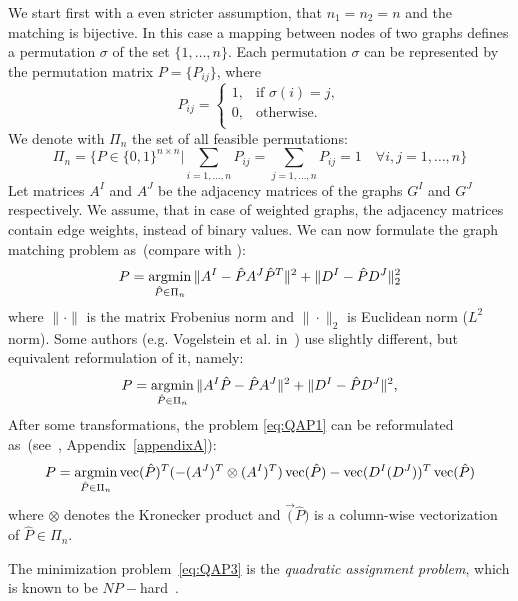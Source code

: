 We start first with a even stricter assumption, that $n_1=n_2=n$ and the matching is bijective. In this case a mapping between nodes of two graphs defines a permutation $\sigma$ of the set $\{1,\dots,n\}$. Each permutation $\sigma$ can be represented by the permutation matrix $P=\{P_{ij}\}$, where
\begin{equation*}
P_{ij}=\begin{cases}
 1, & \text{if } \sigma(i)=j, \\
 0, & \text{otherwise.} \\
\end{cases}
\end{equation*}
We denote with $\Pi_n$ the set of all feasible permutations:
\begin{equation*}
\Pi_n=\{P\in\{0,1\}^{n\times n}|\sum_{i=1,\dots,n}P_{ij}=\sum_{j=1,\dots,n}P_{ij}=1\quad\forall i,j=1,\dots,n\}
\end{equation*}
Let matrices $A^I$ and $A^J$ be the adjacency matrices of the graphs $G^I$ and $G^J$ respectively. We assume, that in case of weighted graphs, the adjacency matrices contain edge weights, instead of binary values. We can now formulate the graph matching problem as~(compare with \cite{Herault1990_SimulatedAnnealing,FastPFP,Lyzinski2015,Roth2001,Umeyam1988,Zazlavskiy2008_PATH}):
\begin{equation} \label{eq:QAP1}
P = \mathop{\rm argmin}_{\hat{P}\in\Pi_n}\|A^I-\hat{P}A^J\hat{P}^T\|^2+\|D^I-\hat{P}D^J\|^2_2
\end{equation}
where $\|\cdot\|$ is the matrix Frobenius norm and $\|\cdot\|_2$ is Euclidean norm ($L^2$ norm). Some authors (e.g. Vogelstein et al. in~\cite{Vogelstein_BrainGraphs}) use slightly different, but equivalent reformulation of it, namely:
\begin{equation} \label{eq:QAP2}
P = \mathop{\rm argmin}_{\hat{P}\in\Pi_n}\|A^I\hat{P}-\hat{P}A^J\|^2+\|D^I-\hat{P}D^J\|^2,
\end{equation}
After some transformations, the problem \eqref{eq:QAP1} can be reformulated as~(see~\cite{Burkard98thequadratic}, Appendix~\ref{appendixA}):
\begin{equation} \label{eq:QAP3}
P = \mathop{\rm argmin}_{\hat{P}\in\Pi_n}\mathop{\rm vec}(\hat{P})^T(-(A^J)^T\otimes(A^I)^T)\mathop{\rm vec}(\hat{P})-\mathop{\rm vec}(D^I(D^J))^T\mathop{\rm vec}(\hat{P})
\end{equation}
where $\otimes$ denotes the Kronecker product and $\vec(\hat{P})$ is a column-wise vectorization of $\hat{P}\in\Pi_n$.

The minimization problem~\eqref{eq:QAP3} is the \emph{quadratic assignment problem}, which is known to be $NP-$hard~\cite{Burkard98thequadratic,Sahni1974}.

